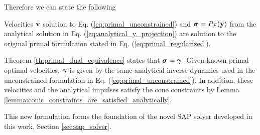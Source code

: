 Therefore we can state the following
\begin{theorem}
    Velocities ${\mathbf{v}}$ solution to Eq. (\ref{eq:primal_unconstrained}) and
    ${\bm\sigma}=P_\mathcal{F}({\mathbf{y}})$ from the analytical solution in Eq.
    (\ref{eq:analytical_y_projection}) are solution to the original primal
    formulation stated in Eq. (\ref{eq:primal_regularized}).
\end{theorem}
\begin{IEEEproof}
    Theorem \ref{th:primal_dual_equivalence} states that ${\bm\sigma}={\bm\gamma}$.
    Given known primal-optimal velocities, ${\bm\gamma}$ is given by the same
    analytical inverse dynamics used in the unconstrained formulation in Eq.
    (\ref{eq:primal_unconstrained}).
    In addition, these velocities and the analytical impulses satisfy the cone
    constraints by Lemma \ref{lemma:conic_constraints_are_satisfied_analytically}.
\end{IEEEproof}

This new formulation forms the foundation of the novel SAP solver developed in
this work, Section \ref{sec:sap_solver}.

